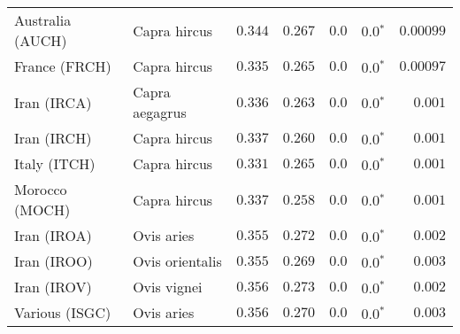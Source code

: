 \begin{center}
\begin{adjustbox}{width = 1\textwidth}
\begin{tabular}{|l|l|r|r|r|r|r|}
               Australia (AUCH) &         Capra hircus &                                           $ 0.344$ &                                           $ 0.267$ &            $0.0$ &                  $\bm{0.0{^*}}$ &          $0.00099$ \\
                  France (FRCH) &         Capra hircus &                                           $ 0.335$ &                                           $ 0.265$ &            $0.0$ &                  $\bm{0.0{^*}}$ &          $0.00097$ \\
                    Iran (IRCA) &       Capra aegagrus &                                           $ 0.336$ &                                           $ 0.263$ &            $0.0$ &                  $\bm{0.0{^*}}$ &           $ 0.001$ \\
                    Iran (IRCH) &         Capra hircus &                                           $ 0.337$ &                                           $ 0.260$ &            $0.0$ &                  $\bm{0.0{^*}}$ &           $ 0.001$ \\
                   Italy (ITCH) &         Capra hircus &                                           $ 0.331$ &                                           $ 0.265$ &            $0.0$ &                  $\bm{0.0{^*}}$ &           $ 0.001$ \\
                 Morocco (MOCH) &         Capra hircus &                                           $ 0.337$ &                                           $ 0.258$ &            $0.0$ &                  $\bm{0.0{^*}}$ &           $ 0.001$ \\
                    Iran (IROA) &           Ovis aries &                                           $ 0.355$ &                                           $ 0.272$ &            $0.0$ &                  $\bm{0.0{^*}}$ &           $ 0.002$ \\
                    Iran (IROO) &      Ovis orientalis &                                           $ 0.355$ &                                           $ 0.269$ &            $0.0$ &                  $\bm{0.0{^*}}$ &           $ 0.003$ \\
                    Iran (IROV) &          Ovis vignei &                                           $ 0.356$ &                                           $ 0.273$ &            $0.0$ &                  $\bm{0.0{^*}}$ &           $ 0.002$ \\
                 Various (ISGC) &           Ovis aries &                                           $ 0.356$ &                                           $ 0.270$ &            $0.0$ &                  $\bm{0.0{^*}}$ &           $ 0.003$ \\

\end{tabular}
\end{adjustbox}
\end{center}

